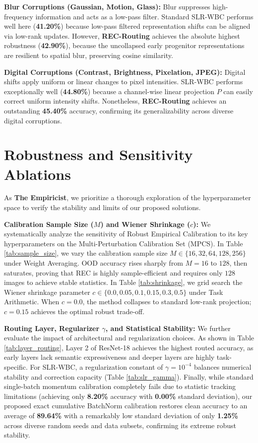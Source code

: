 \documentclass{article}
\theoremstyle{plain}
\theoremstyle{definition}
\theoremstyle{remark}
\begin{document}
\textbf{Blur Corruptions (Gaussian, Motion, Glass):} Blur suppresses high-frequency information and acts as a low-pass filter. Standard SLR-WBC performs well here (\textbf{41.20\%}) because low-pass filtered representation shifts can be aligned via low-rank updates. However, \textbf{REC-Routing} achieves the absolute highest robustness (\textbf{42.90\%}), because the uncollapsed early progenitor representations are resilient to spatial blur, preserving cosine similarity.

\textbf{Digital Corruptions (Contrast, Brightness, Pixelation, JPEG):} Digital shifts apply uniform or linear changes to pixel intensities. SLR-WBC performs exceptionally well (\textbf{44.80\%}) because a channel-wise linear projection $P$ can easily correct uniform intensity shifts. Nonetheless, \textbf{REC-Routing} achieves an outstanding \textbf{45.40\%} accuracy, confirming its generalizability across diverse digital corruptions.

\section{Robustness and Sensitivity Ablations}
\label{sec:ablations}

As \textbf{The Empiricist}, we prioritize a thorough exploration of the hyperparameter space to verify the stability and limits of our proposed solutions.

\textbf{Calibration Sample Size ($M$) and Wiener Shrinkage ($c$):} We systematically analyze the sensitivity of Robust Empirical Calibration to its key hyperparameters on the Multi-Perturbation Calibration Set (MPCS). In Table \ref{tab:sample_size}, we vary the calibration sample size $M \in \{16, 32, 64, 128, 256\}$ under Weight Averaging. OOD accuracy rises sharply from $M=16$ to $128$, then saturates, proving that REC is highly sample-efficient and requires only $128$ images to achieve stable statistics. In Table \ref{tab:shrinkage}, we grid search the Wiener shrinkage parameter $c \in \{0.0, 0.05, 0.1, 0.15, 0.3, 0.5\}$ under Task Arithmetic. When $c=0.0$, the method collapses to standard low-rank projection; $c=0.15$ achieves the optimal robust trade-off.

\textbf{Routing Layer, Regularizer $\gamma$, and Statistical Stability:} We further evaluate the impact of architectural and regularization choices. As shown in Table \ref{tab:layer_routing}, Layer 2 of ResNet-18 achieves the highest routed accuracy, as early layers lack semantic expressiveness and deeper layers are highly task-specific. For SLR-WBC, a regularization constant of $\gamma = 10^{-4}$ balances numerical stability and correction capacity (Table \ref{tab:slr_gamma}). Finally, while standard single-batch momentum calibration completely fails due to statistic tracking limitations (achieving only \textbf{8.20\%} accuracy with \textbf{0.00\%} standard deviation), our proposed exact cumulative BatchNorm calibration restores clean accuracy to an average of \textbf{89.64\%} with a remarkably low standard deviation of only \textbf{1.25\%} across diverse random seeds and data subsets, confirming its extreme robust stability.
\end{document}
